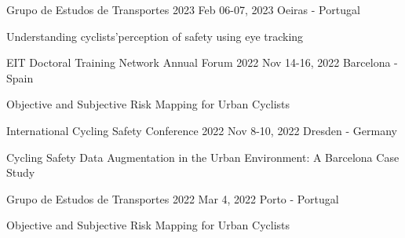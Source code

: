 

\begin{cventries}

\cventrypresentation
{Grupo de Estudos de Transportes 2023} %
{Feb 06-07, 2023} %
{Oeiras - Portugal} %
{
	\begin{cvpresentationitems} %
		\item {} {Understanding cyclists'perception of safety using eye tracking}
	\end{cvpresentationitems}
}


\cventrypresentation
	{EIT Doctoral Training Network Annual Forum 2022} %
	{Nov 14-16, 2022} %
	{Barcelona - Spain} %
	{
		\begin{cvpresentationitems} %
			\item {} {Objective and Subjective Risk Mapping for Urban Cyclists}
		\end{cvpresentationitems}
	}

  \cventrypresentation
	{International Cycling Safety Conference 2022} %
	{Nov 8-10, 2022} %
	{Dresden - Germany} %
	{
		\begin{cvpresentationitems} %
			\item {} {Cycling Safety Data Augmentation 
			in the Urban Environment: A Barcelona Case Study}
		\end{cvpresentationitems}
	}

  \cventrypresentation
    {Grupo de Estudos de Transportes 2022} %
    {Mar 4, 2022} %
    {Porto - Portugal} %
    {
      \begin{cvpresentationitems} %
        \item {} {Objective and Subjective Risk Mapping for Urban Cyclists}
      \end{cvpresentationitems}
    }


\end{cventries}
